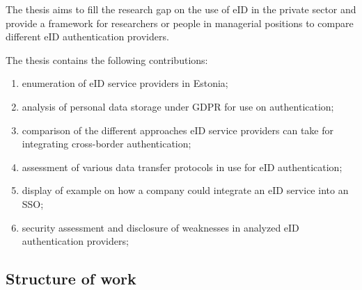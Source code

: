 The thesis aims to fill the research gap on the use of eID in the private sector and provide a framework for researchers or people in managerial positions to compare different eID authentication providers.

The thesis contains the following contributions:

\begin{enumerate}
    \item enumeration of eID service providers in Estonia;
    \item analysis of personal data storage under GDPR for use on authentication;
    \item comparison of the different approaches eID service providers can take for integrating cross-border authentication;
    \item assessment of various data transfer protocols in use for eID authentication;
    \item display of example on how a company could integrate an eID service into an SSO;
    \item security assessment and disclosure of weaknesses in analyzed eID authentication providers;
\end{enumerate}




\subsection{Structure of work}

